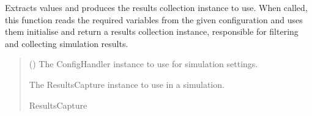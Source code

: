 \documentclass[letterpaper,10pt,english]{sphinxmanual}
\begin{document}
\begin{fulllineitems}
\label{\detokenize{modules/input/config:qnav.input.config.get_collector}}
\pysigstartsignatures
{}
\pysigstopsignatures
\sphinxAtStartPar
Extracts values and produces the results collection instance to use.
When called, this function reads the required variables from the
given configuration and uses them initialise and return a results
collection instance, responsible for filtering and collecting
simulation results.
\begin{quote}\begin{description}
\sphinxAtStartPar
{} ({\hyperref[\detokenize{modules/input/config_handler:qnav.input.config_handler.ConfigHandler}]{}}) \textendash{} The ConfigHandler instance to use for simulation settings.

\sphinxAtStartPar
The ResultsCapture instance to use in a simulation.

\sphinxAtStartPar
ResultsCapture

\end{description}\end{quote}

\end{fulllineitems}

\end{document}
